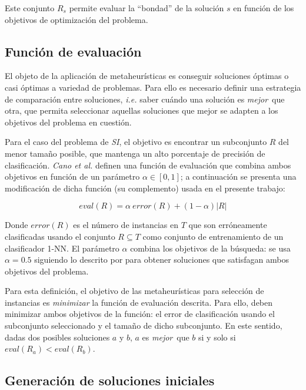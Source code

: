 Este conjunto $R_s$ permite evaluar la ``bondad'' de la solución $s$ en función de los objetivos de optimización del problema.

\subsection{Función de evaluación}

El objeto de la aplicación de metaheurísticas es conseguir soluciones óptimas o casi óptimas a variedad de problemas. Para ello es necesario definir una estrategia de comparación entre soluciones, \emph{i.e.} saber cuándo una solución es \guillemotleft\emph{mejor}\guillemotright\ que otra, que permita seleccionar aquellas soluciones que mejor se adapten a los objetivos del problema en cuestión.

Para el caso del problema de \emph{SI}, el objetivo es encontrar un subconjunto $R$ del menor tamaño posible, que mantenga un alto porcentaje de precisión de clasificación. \emph{Cano et al.} \cite{cano2003using} definen una función de evaluación que combina ambos objetivos en función de un parámetro $\alpha \in [0,1]$; a continuación se presenta una modificación de dicha función (su complemento) usada en el presente trabajo:

\begin{equation}
\mathit{eval}(R) = \alpha\ \mathit{error}(R) + (1 - \alpha) \vert R \vert
\end{equation}

Donde $\mathit{error}(R)$ es el número de instancias en $T$ que son erróneamente clasificadas usando el conjunto $R \subseteq T$ como conjunto de entrenamiento de un clasificador 1-NN. El parámetro $\alpha$ combina los objetivos de la búsqueda: se usa $\alpha = 0.5$ siguiendo lo descrito por \cite{cano2003using} para obtener soluciones que satisfagan ambos objetivos del problema.

Para esta definición, el objetivo de las metaheurísticas para selección de instancias es \emph{minimizar} la función de evaluación descrita. Para ello, deben minimizar ambos objetivos de la función: el error de clasificación usando el subconjunto seleccionado y el tamaño de dicho subconjunto. En este sentido, dadas dos posibles soluciones $a$ y $b$, $a$ es \guillemotleft\emph{mejor}\guillemotright\ que $b$ si y solo si $\mathit{eval}(R_a) < \mathit{eval}(R_b)$.

\subsection{Generación de soluciones iniciales}
\label{generacion-sol-inic}

